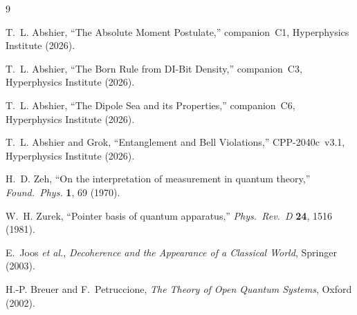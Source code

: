 \documentclass[11pt,a4paper]{article}
\begin{document}

\begin{thebibliography}{9}

T.~L. Abshier, ``The Absolute Moment Postulate,''
companion~C1, Hyperphysics Institute (2026).

T.~L. Abshier, ``The Born Rule from DI-Bit Density,''
companion~C3, Hyperphysics Institute (2026).

T.~L. Abshier, ``The Dipole Sea and its Properties,''
companion~C6, Hyperphysics Institute (2026).

T.~L. Abshier and Grok,
``Entanglement and Bell Violations,''
CPP-2040c~v3.1, Hyperphysics Institute (2026).

H.~D. Zeh, ``On the interpretation of measurement in quantum theory,''
\textit{Found.\ Phys.} \textbf{1}, 69 (1970).

W.~H. Zurek, ``Pointer basis of quantum apparatus,''
\textit{Phys.\ Rev.\ D} \textbf{24}, 1516 (1981).

E.~Joos \textit{et al.},
\textit{Decoherence and the Appearance of a Classical World},
Springer (2003).

H.-P. Breuer and F.~Petruccione,
\textit{The Theory of Open Quantum Systems}, Oxford (2002).

\end{thebibliography}
\end{document}
